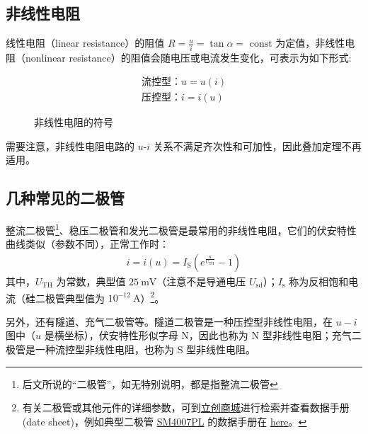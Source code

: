 \documentclass[UTF8]{report}
\def\mV{\ \mathrm{mV}}
\theoremstyle{MyLineTheoremStyle} %
\theoremstyle{MyBlockTheoremStyle} %
\theoremstyle{MySubsubsectionStyle} %
\begin{document}
\subsection{非线性电阻}

线性电阻（linear resistance）的阻值 $R = \frac{u}{i} = \tan \alpha = \text{\ const}$ 为定值，非线性电阻（nonlinear resistance）的阻值会随电压或电流发生变化，可表示为如下形式: 
\begin{center}\noindent\begin{minipage}{0.49\columnwidth}
    \begin{gather}
        \text{流控型：} u = u(i) \\ 
        \text{压控型：} i = i(u)
    \end{gather}
\end{minipage}\hfill\begin{minipage}{0.49\columnwidth}
    \begin{figure}[H]\centering
    \caption{非线性电阻的符号}\label{非线性电阻的符号}
    \end{figure}
\end{minipage}\end{center}

需要注意，非线性电阻电路的 $u$-$i$ 关系不满足齐次性和可加性，因此叠加定理不再适用。


\subsection{几种常见的二极管}

整流二极管\footnote{后文所说的“二极管”，如无特别说明，都是指整流二极管}、稳压二极管和发光二极管是最常用的非线性电阻，它们的伏安特性曲线类似（参数不同），正常工作时：
\begin{gather}
i = i(u) = I_\text{S}\left(e^{\frac{u}{U_{\text{TH}}}} - 1\right)
\end{gather}
其中，$U_{\text{TH}}$ 为常数，典型值 $25 \mV$（注意不是导通电压 $U_{\text{sd}}$）；$I_\text{s}$ 称为反相饱和电流（硅二极管典型值为 $10^{-12} \ \mathrm{A}$）\footnote{有关二极管或其他元件的详细参数，可到\href{https://www.szlcsc.com/}{立创商城}进行检索并查看数据手册 (date sheet)，例如典型二极管 \href{https://item.szlcsc.com/65968.html}{SM4007PL} 的数据手册在 \href{https://atta.szlcsc.com/upload/public/pdf/source/20240710/496933BE705816864AC9581E766E463F.pdf}{here}。}。

另外，还有隧道、充气二极管等。隧道二极管是一种压控型非线性电阻，在 $u-i$ 图中（$u$ 是横坐标），伏安特性形似字母 N，因此也称为 N 型非线性电阻；充气二极管是一种流控型非线性电阻，也称为 S 型非线性电阻。
\end{document}
